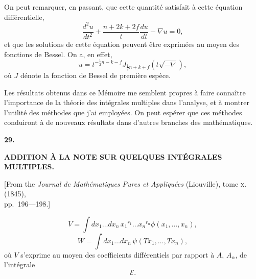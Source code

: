 \documentclass[11pt,a4paper]{book}
\begin{document}
On peut remarquer, en passant, que cette quantit\'{e} satisfait \`{a} cette \'{e}quation diff\'{e}rentielle,
\[
\frac{d^{2}u}{dt^{2}} + \frac{n+2k+2f}{t} \frac{du}{dt} - \nabla u = 0,
\]
et que les solutions de cette \'{e}quation peuvent \^{e}tre exprim\'{e}es au moyen des fonctions de
Bessel. On a, en effet,
\[
u = t^{-\frac{1}{2}n-k-f} J_{\frac{1}{2}n+k+f}(t\sqrt{-\nabla}),
\]
o\`{u} $J$ d\'{e}note la fonction de Bessel de premi\`{e}re esp\`{e}ce.

\newpage
\setcounter{page}{206}

Les r\'{e}sultats obtenus dans ce M\'{e}moire me semblent propres \`{a} faire conna\^{i}tre
l'importance de la th\'{e}orie des int\'{e}grales multiples dans l'analyse, et \`{a} montrer l'utilit\'{e}
des m\'{e}thodes que j'ai employ\'{e}es. On peut esp\'{e}rer que ces m\'{e}thodes conduiront \`{a} de
nouveaux r\'{e}sultats dans d'autres branches des math\'{e}matiques.


\newpage
{}
\setcounter{page}{206}

\begin{center}
{\large\bfseries 29.}
\end{center}
\vspace{0.5em}
\begin{center}
{\large\bfseries ADDITION \`{A} LA NOTE SUR QUELQUES INT\'{E}GRALES MULTIPLES.}
\end{center}
\vspace{0.5em}
\begin{center}
{[From the \textit{Journal de Math\'{e}matiques Pures et Appliqu\'{e}es} (Liouville), tome \textsc{x}. (1845),\\
pp.~196---198.]}
\end{center}
\vspace{1em}

\[
V = \int dx_1 \ldots dx_n \, x_1{}^{r_1} \ldots x_n{}^{r_n} \phi(x_1, \ldots, x_n),
\]
\[
W = \int dx_1 \ldots dx_n \, \psi(Tx_1, \ldots, Tx_n),
\]
o\`{u} $V$ s'exprime au moyen des coefficients diff\'{e}rentiels par rapport \`{a} $A$, $A_\alpha$, de l'int\'{e}grale
\[
\mathcal{E}.
\]

\end{document}
